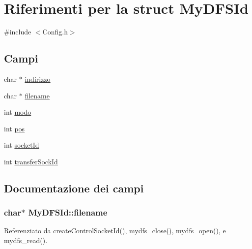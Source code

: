 \hypertarget{structMyDFSId}{}\section{Riferimenti per la struct My\+D\+F\+S\+Id}
\label{structMyDFSId}


{\ttfamily \#include $<$Config.\+h$>$}

\subsection*{Campi}
\begin{DoxyCompactItemize}
\item 
char $\ast$ \hyperlink{structMyDFSId_ac8c10a1a5b18776bf5e5585ee9e26331}{indirizzo}
\item 
char $\ast$ \hyperlink{structMyDFSId_ac0e1b8c96d859982c1a7d49f9e929e48}{filename}
\item 
int \hyperlink{structMyDFSId_a98bc5ce1a7734459d8b81c997da4e9f0}{modo}
\item 
int \hyperlink{structMyDFSId_aaeac229fb85c313f91a76f00be916832}{pos}
\item 
int \hyperlink{structMyDFSId_a382a74f109962751085cea7aac2892cc}{socket\+Id}
\item 
int \hyperlink{structMyDFSId_a3b62a6d0f52a871bda4bf9cd56c57ff7}{transfer\+Sock\+Id}
\end{DoxyCompactItemize}


\subsection{Documentazione dei campi}
\hypertarget{structMyDFSId_ac0e1b8c96d859982c1a7d49f9e929e48}{}
\subsubsection[{filename}]{\setlength{\rightskip}{0pt plus 5cm}char$\ast$ My\+D\+F\+S\+Id\+::filename}\label{structMyDFSId_ac0e1b8c96d859982c1a7d49f9e929e48}


Referenziato da create\+Control\+Socket\+Id(), mydfs\+\_\+close(), mydfs\+\_\+open(), e mydfs\+\_\+read().

\hypertarget{structMyDFSId_ac8c10a1a5b18776bf5e5585ee9e26331}{}
